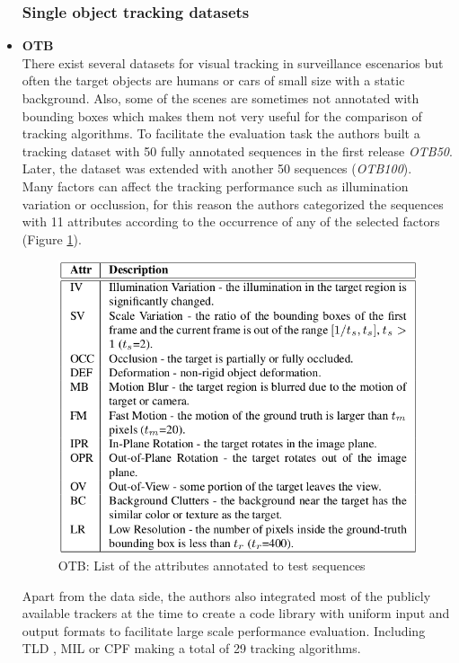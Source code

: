 \begin{itemize}
\subsubsection{Single object tracking datasets}
\item \textbf{OTB} ~\cite{wu2013online}\\
There exist several datasets for visual tracking in surveillance escenarios but often the target objects are humans or cars of small size with a static background. Also, some of the scenes are sometimes not annotated with bounding boxes which makes them not very useful for the comparison of tracking algorithms. To facilitate the evaluation task the authors built a tracking dataset with 50 fully annotated sequences in the first release \textit{OTB50}. Later, the dataset was extended with another 50 sequences (\textit{OTB100}).\\ Many factors can affect the tracking performance such as illumination variation or occlussion, for this reason the authors categorized the sequences with 11 attributes according to the occurrence of any of the selected factors (Figure \ref{fig:otb}).\\
\begin{figure}[H]
\begin{center}
\includegraphics[scale=0.3]{previous_version/otb_attributes.png}
\caption{OTB: List of the attributes annotated to test sequences ~\cite{wu2013online}}
\label{fig:otb}
\end{center}
\end{figure}
Apart from the data side, the authors also integrated most of the publicly available trackers at the time to create a code library with uniform input and output formats to facilitate large scale performance evaluation. Including TLD \cite{kalal2010pn}, MIL \cite{babenko2009visual} or CPF \cite{perez2002color} making a total of 29 tracking algorithms.

\end{itemize}
